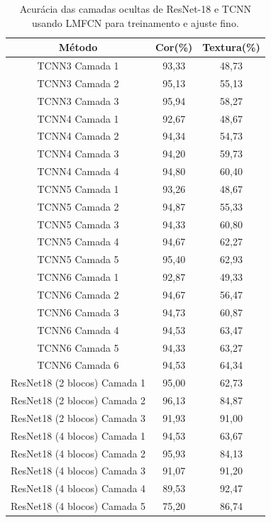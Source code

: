 \documentclass[conference]{IEEEtran}
\begin{document}
\begin{table}[htbp]
\caption{Acur\'{a}cia das camadas ocultas de ResNet-18 e TCNN usando LMFCN para treinamento e ajuste fino.}
\begin{center}
\begin{tabular}{|c|c|c|}
\hline
\textbf{M\'{e}todo} & \textbf{Cor(\%)} & \textbf{Textura(\%)}\\
\hline
TCNN3 Camada 1 & 93,33 & 48,73 \\
\hline
TCNN3 Camada 2 & 95,13 & 55,13 \\
\hline
TCNN3 Camada 3 & 95,94 & 58,27 \\
\hline
TCNN4 Camada 1 & 92,67 & 48,67 \\
\hline
TCNN4 Camada 2 & 94,34 & 54,73 \\
\hline
TCNN4 Camada 3 & 94,20 & 59,73 \\
\hline
TCNN4 Camada 4 & 94,80 & 60,40 \\
\hline
TCNN5 Camada 1 & 93,26 & 48,67 \\
\hline
TCNN5 Camada 2 & 94,87 & 55,33 \\
\hline
TCNN5 Camada 3 & 94,33 & 60,80 \\
\hline
TCNN5 Camada 4 & 94,67 & 62,27 \\
\hline
TCNN5 Camada 5 & 95,40 & 62,93 \\
\hline
TCNN6 Camada 1 & 92,87 & 49,33 \\
\hline
TCNN6 Camada 2 & 94,67 & 56,47 \\
\hline
TCNN6 Camada 3 & 94,73 & 60,87 \\
\hline
TCNN6 Camada 4 & 94,53 & 63,47 \\
\hline
TCNN6 Camada 5 & 94,33 & 63,27 \\
\hline
TCNN6 Camada 6 & 94,53 & 64,34 \\
\hline
ResNet18 (2 blocos) Camada 1 & 95,00 & 62,73 \\
\hline
ResNet18 (2 blocos) Camada 2 & 96,13 & 84,87 \\
\hline
ResNet18 (2 blocos) Camada 3 & 91,93 & 91,00 \\
\hline
ResNet18 (4 blocos) Camada 1 & 94,53 & 63,67 \\
\hline
ResNet18 (4 blocos) Camada 2 & 95,93 & 84,13 \\
\hline
ResNet18 (4 blocos) Camada 3 & 91,07 & 91,20 \\
\hline
ResNet18 (4 blocos) Camada 4 & 89,53 & 92,47 \\
\hline
ResNet18 (4 blocos) Camada 5 & 75,20 & 86,74 \\
\hline
\end{tabular}
\label{tab1}
\end{center}
\end{table}
\end{document}
